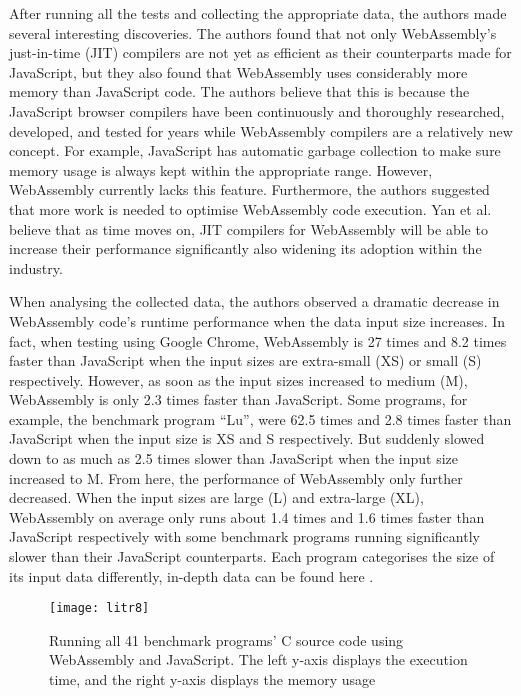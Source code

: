 After running all the tests and collecting the appropriate data, the authors made several interesting discoveries. The authors found that not only WebAssembly’s just-in-time (JIT) compilers are not yet as efficient as their counterparts made for JavaScript, but they also found that WebAssembly uses considerably more memory than JavaScript code. The authors believe that this is because the JavaScript browser compilers have been continuously and thoroughly researched, developed, and tested for years while WebAssembly compilers are a relatively new concept. For example, JavaScript has automatic garbage collection to make sure memory usage is always kept within the appropriate range. However, WebAssembly currently lacks this feature. Furthermore, the authors suggested that more work is needed to optimise WebAssembly code execution. Yan et al. believe that as time moves on, JIT compilers for WebAssembly will be able to increase their performance significantly also widening its adoption within the industry.

When analysing the collected data, the authors observed a dramatic decrease in WebAssembly code’s runtime performance when the data input size increases. In fact, when testing using Google Chrome, WebAssembly is 27 times and 8.2 times faster than JavaScript when the input sizes are extra-small (XS) or small (S) respectively. However, as soon as the input sizes increased to medium (M), WebAssembly is only 2.3 times faster than JavaScript. Some programs, for example, the benchmark program “Lu”, were 62.5 times and 2.8 times faster than JavaScript when the input size is XS and S respectively. But suddenly slowed down to as much as 2.5 times slower than JavaScript when the input size increased to M. From here, the performance of WebAssembly only further decreased. When the input sizes are large (L) and extra-large (XL), WebAssembly on average only runs about 1.4 times and 1.6 times faster than JavaScript respectively with some benchmark programs running significantly slower than their JavaScript counterparts. Each program categorises the size of its input data differently, in-depth data can be found here \cite{lit17}.

\newpage
\bigskip
\begin{figure}[hp]
\centering
\texttt{[image: litr8]}
\caption{\footnotesize{Running all 41 benchmark programs’ C source code using WebAssembly and JavaScript. The left y-axis displays the execution time, and the right y-axis displays the memory usage \cite{lit17}}}
\captionsetup{aboveskip=0pt,font=it}
\end{figure}
\bigskip

